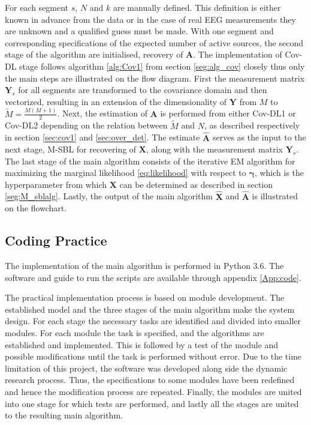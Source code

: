 For each segment $s$, $N$ and $k$ are manually defined. 
This definition is either known in advance from the data or in the case of real EEG measurements they are unknown and a qualified guess must be made.
With one segment and corresponding specifications of the expected number of active sources, the second stage of the algorithm are initialised, recovery of $\mathbf{A}$.
The implementation of Cov-DL stage follows algorithm \ref{alg:Cov1} from section \ref{seg:alg_cov} closely thus only the main steps are illustrated on the flow diagram.
First the measurement matrix $\mathbf{Y}_s$ for all segments are transformed to the covariance domain and then vectorized, resulting in an extension of the dimensionality of $\mathbf{Y}$ from $M$ to $\widetilde{M} = \frac{M(M+1)}{2}$.
Next, the estimation of $\mathbf{A}$ is performed from either Cov-DL1 or Cov-DL2 depending on the relation between $\widetilde{M}$ and $N$, as described respectively in section \ref{sec:cov1} and \ref{sec:over_det}.
The estimate $\hat{\mathbf{A}}$ serves as the input to the next stage, M-SBL for recovering of $\mathbf{X}$, along with the measurement matrix $\mathbf{Y}_s$. 
The last stage of the main algorithm consists of the iterative EM algorithm for maximizing the marginal likelihood \eqref{eq:likelihood} with respect to $\boldsymbol{\gamma}$, which is the hyperparameter from which $\mathbf{X}$ can be determined as described in section \ref{seg:M_sblalg}. 
Lastly, the output of the main algorithm $\hat{\mathbf{X}}$ and $\hat{\mathbf{A}}$ is illustrated on the flowchart.

\subsection{Coding Practice}
The implementation of the main algorithm is performed in Python 3.6. The software and guide to run the scripts are available through appendix \ref{App:code}.

The practical implementation process is based on module development. 
The established model and the three stages of the main algorithm make the system design. 
For each stage the necessary tasks are identified and divided into smaller modules. 
For each module the task is specified, and the algorithms are established and implemented. 
This is followed by a test of the module and possible modifications until the task is performed without error. 
Due to the time limitation of this project, the software was developed along side the dynamic research process. 
Thus, the specifications to some modules have been redefined and hence the modification process are repeated. 
Finally, the modules are united into one stage for which tests are performed, and lastly all the stages are united to the resulting main algorithm.

